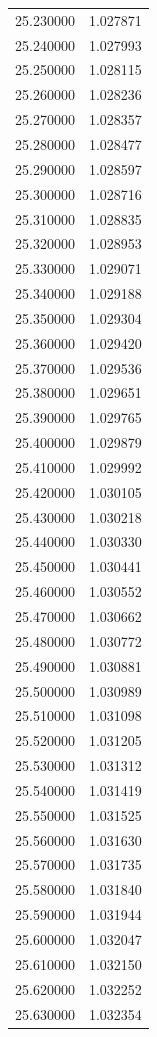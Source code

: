 \begin{tabular}{rr}
25.230000 & 1.027871 \\
25.240000 & 1.027993 \\
25.250000 & 1.028115 \\
25.260000 & 1.028236 \\
25.270000 & 1.028357 \\
25.280000 & 1.028477 \\
25.290000 & 1.028597 \\
25.300000 & 1.028716 \\
25.310000 & 1.028835 \\
25.320000 & 1.028953 \\
25.330000 & 1.029071 \\
25.340000 & 1.029188 \\
25.350000 & 1.029304 \\
25.360000 & 1.029420 \\
25.370000 & 1.029536 \\
25.380000 & 1.029651 \\
25.390000 & 1.029765 \\
25.400000 & 1.029879 \\
25.410000 & 1.029992 \\
25.420000 & 1.030105 \\
25.430000 & 1.030218 \\
25.440000 & 1.030330 \\
25.450000 & 1.030441 \\
25.460000 & 1.030552 \\
25.470000 & 1.030662 \\
25.480000 & 1.030772 \\
25.490000 & 1.030881 \\
25.500000 & 1.030989 \\
25.510000 & 1.031098 \\
25.520000 & 1.031205 \\
25.530000 & 1.031312 \\
25.540000 & 1.031419 \\
25.550000 & 1.031525 \\
25.560000 & 1.031630 \\
25.570000 & 1.031735 \\
25.580000 & 1.031840 \\
25.590000 & 1.031944 \\
25.600000 & 1.032047 \\
25.610000 & 1.032150 \\
25.620000 & 1.032252 \\
25.630000 & 1.032354 \\

\end{tabular}
